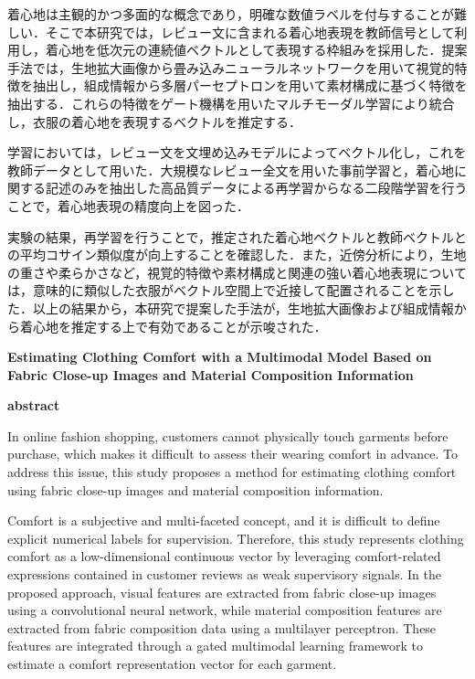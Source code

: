 \documentclass[a4paper,12pt]{jreport}
\begin{document}
着心地は主観的かつ多面的な概念であり，明確な数値ラベルを付与することが難しい．そこで本研究では，レビュー文に含まれる着心地表現を教師信号として利用し，着心地を低次元の連続値ベクトルとして表現する枠組みを採用した．提案手法では，生地拡大画像から畳み込みニューラルネットワークを用いて視覚的特徴を抽出し，組成情報から多層パーセプトロンを用いて素材構成に基づく特徴を抽出する．これらの特徴をゲート機構を用いたマルチモーダル学習により統合し，衣服の着心地を表現するベクトルを推定する．

学習においては，レビュー文を文埋め込みモデルによってベクトル化し，これを教師データとして用いた．大規模なレビュー全文を用いた事前学習と，着心地に関する記述のみを抽出した高品質データによる再学習からなる二段階学習を行うことで，着心地表現の精度向上を図った．

実験の結果，再学習を行うことで，推定された着心地ベクトルと教師ベクトルとの平均コサイン類似度が向上することを確認した．また，近傍分析により，生地の重さや柔らかさなど，視覚的特徴や素材構成と関連の強い着心地表現については，意味的に類似した衣服がベクトル空間上で近接して配置されることを示した．以上の結果から，本研究で提案した手法が，生地拡大画像および組成情報から着心地を推定する上で有効であることが示唆された．

\clearpage


\begin{center}
{\LARGE {\bf Estimating Clothing Comfort with a Multimodal Model Based on Fabric Close-up Images and Material Composition Information}}


\vspace{8mm}

{\Large {\bf abstract}}
\end{center}

In online fashion shopping, customers cannot physically touch garments before purchase, which makes it difficult to assess their wearing comfort in advance. To address this issue, this study proposes a method for estimating clothing comfort using fabric close-up images and material composition information.

Comfort is a subjective and multi-faceted concept, and it is difficult to define explicit numerical labels for supervision. Therefore, this study represents clothing comfort as a low-dimensional continuous vector by leveraging comfort-related expressions contained in customer reviews as weak supervisory signals. In the proposed approach, visual features are extracted from fabric close-up images using a convolutional neural network, while material composition features are extracted from fabric composition data using a multilayer perceptron. These features are integrated through a gated multimodal learning framework to estimate a comfort representation vector for each garment.
\end{document}
